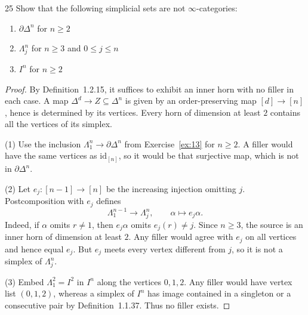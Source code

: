 \begin{exercise}{25}
Show that the following simplicial sets are not $\infty$-categories:
\begin{enumerate}[label=(\arabic*),leftmargin=*,itemsep=0pt,parsep=0pt,
                  topsep=.5\baselineskip]
 \item $\partial\Delta^n$ for $n\ge2$
 \item $\Lambda_j^n$ for $n\ge3$ and $0\le j\le n$
 \item $I^n$ for $n\ge2$
\end{enumerate}

\begin{proof}
By Definition~1.2.15, it suffices to exhibit an inner horn with no
filler in each case. A map $\Delta^d\to Z\subseteq\Delta^n$ is
given by an order-preserving map $[d]\to[n]$, hence is determined
by its vertices. Every horn of dimension at least $2$ contains
all the vertices of its simplex.

(1) Use the inclusion $\Lambda_1^n\to\partial\Delta^n$ from
Exercise~\ref{ex:13} for $n\ge2$.
A filler would have the same vertices as $\mathrm{id}_{[n]}$,
so it would be that surjective map, which is not in
$\partial\Delta^n$.

(2) Let $e_j\colon[n-1]\to[n]$ be the increasing injection
omitting $j$. Postcomposition with $e_j$ defines
\[
 \Lambda_1^{n-1}\longrightarrow\Lambda_j^n,
 \qquad \alpha\longmapsto e_j\alpha.
\]
Indeed, if $\alpha$ omits $r\ne1$, then $e_j\alpha$ omits $e_j(r)\ne j$.
Since $n\ge3$, the source is an inner horn of dimension at least
$2$. Any filler would agree with $e_j$ on all vertices and hence
equal $e_j$. But $e_j$ meets every vertex different from $j$,
so it is not a simplex of $\Lambda_j^n$.

(3) Embed $\Lambda_1^2=I^2$ in $I^n$ along the vertices $0,1,2$.
Any filler would have vertex list $(0,1,2)$, whereas a simplex
of $I^n$ has image contained in a singleton or a consecutive
pair by Definition~1.1.37. Thus no filler exists.
\end{proof}
\end{exercise}

